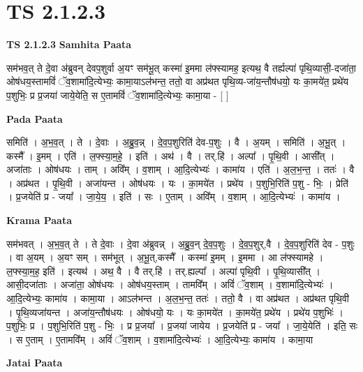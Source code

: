 \documentclass[17pt]{extarticle}
\begin{document}
\section*{ TS 2.1.2.3 }

\textbf{TS 2.1.2.3 } \newline
\textbf{Samhita Paata} \newline

सम॑भव॒त् ते दे॒वा अ॑ब्रुवन् देवप॒शुर्वा अ॒यꣳ सम॑भू॒त् कस्मा॑ इ॒ममा ल॑फ्स्यामह॒ इत्यथ॒ वै तर्ह्यल्पा॑ पृथि॒व्यासी॒-दजा॑ता॒ ओष॑धय॒स्तामविं॑ ॅव॒शामा॑दि॒त्येभ्यः॒ कामा॒याऽल॑भन्त॒ ततो॒ वा अप्र॑थत पृथि॒व्य-जा॑य॒न्तौष॑धयो॒ यः का॒मये॑त॒ प्रथे॑य प॒शुभिः॒ प्र प्र॒जया॑ जाये॒येति॒ स ए॒तामविं॑ ॅव॒शामा॑दि॒त्येभ्यः॒ कामा॒या - [  ] \newline

\textbf{Pada Paata} \newline

समिति॑ । अ॒भ॒व॒त् । ते । दे॒वाः । अ॒ब्रु॒व॒न्न् । दे॒व॒प॒शुरिति॑ देव-प॒शुः । वै । अ॒यम् । समिति॑ । अ॒भू॒त् । कस्मै᳚ । इ॒मम् । एति॑ । ल॒फ्स्या॒म॒हे॒ । इति॑ । अथ॑ । वै । तर्.हि॑ । अल्पा᳚ । पृ॒थि॒वी । आसी᳚त् । अजा॑ताः । ओष॑धयः । ताम् । अवि᳚म् । व॒शाम् । आ॒दि॒त्येभ्यः॑ । कामा॑य । एति॑ । अ॒ल॒भ॒न्त॒ । ततः॑ । वै । अप्र॑थत । पृ॒थि॒वी । अजा॑यन्त । ओष॑धयः । यः । का॒मये॑त । प्रथे॑य । प॒शुभि॒रिति॑ प॒शु - भिः॒ । प्रेति॑ । प्र॒जयेति॑ प्र - जया᳚ । जा॒ये॒य॒ । इति॑ । सः । ए॒ताम् । अवि᳚म् । व॒शाम् । आ॒दि॒त्येभ्यः॑ । कामा॑य ।  \newline


\textbf{Krama Paata} \newline

सम॑भवत् । अ॒भ॒व॒त् ते । ते दे॒वाः । दे॒वा अ॑ब्रुवन्न् । अ॒ब्रु॒व॒न् दे॒व॒प॒शुः । दे॒व॒प॒शुर्,वै । दे॒व॒प॒शुरिति॑ देव - प॒शुः । वा अ॒यम् । अ॒यꣳ सम् । सम॑भूत् । अ॒भू॒त्,कस्मै᳚ । कस्मा॑ इ॒मम् । इ॒ममा । आ ल॑फ्स्यामहे । ल॒फ्स्या॒म॒ह॒ इति॑ । इत्यथ॑ । अथ॒ वै । वै तर्.हि॑ । तर्.ह्यल्पा᳚ । अल्पा॑ पृथि॒वी । पृ॒थि॒व्यासी᳚त् । आसी॒दजा॑ताः । अजा॑ता॒ ओष॑धयः । ओष॑धय॒स्ताम् । तामवि᳚म् । अविं॑ ॅव॒शाम् । व॒शामा॑दि॒त्येभ्यः॑ । आ॒दि॒त्येभ्यः॒ कामा॑य । कामा॒या । आऽल॑भन्त । अ॒ल॒भ॒न्त॒ ततः॑ । ततो॒ वै । वा अप्र॑थत । अप्र॑थत पृथि॒वी । पृ॒थि॒व्यजा॑यन्त । अजा॑य॒न्तौष॑धयः । ओष॑धयो॒ यः । यः का॒मये॑त । का॒मये॑त॒ प्रथे॑य । प्रथे॑य प॒शुभिः॑ । प॒शुभिः॒ प्र । प॒शुभि॒रिति॑ प॒शु - भिः॒ । प्र प्र॒जया᳚ । प्र॒जया॑ जायेय । प्र॒जयेति॑ प्र - जया᳚ । जा॒ये॒येति॑ । इति॒ सः । स ए॒ताम् । ए॒तामवि᳚म् । अविं॑ ॅव॒शाम् । व॒शामा॑दि॒त्येभ्यः॑ । आ॒दि॒त्येभ्यः॒ कामा॑य । कामा॒या \newline

\textbf{Jatai Paata} \newline
\end{document}
